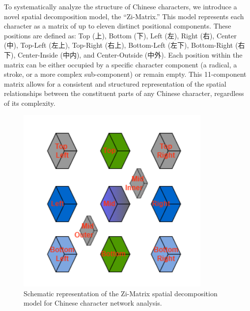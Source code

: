 \documentclass[11pt,letterpaper]{article}
\begin{document}
To systematically analyze the structure of Chinese characters, we
introduce a novel spatial decomposition model, the ``Zi-Matrix.'' This
model represents each character as a matrix of up to eleven distinct
positional components. These positions are defined as: Top (上), Bottom
(下), Left (左), Right (右), Center (中), Top-Left (左上), Top-Right
(右上), Bottom-Left (左下), Bottom-Right (右下), Center-Inside (中内),
and Center-Outside (中外). Each position within the matrix can be either
occupied by a specific character component (a radical, a stroke, or a
more complex sub-component) or remain empty. This 11-component matrix
allows for a consistent and structured representation of the spatial
relationships between the constituent parts of any Chinese character,
regardless of its complexity.

\begin{figure}
\centering
\includegraphics[width=0.85\textwidth]{./images/zi-matrix.png}
\caption{Schematic representation of the Zi-Matrix spatial decomposition
model for Chinese character network analysis.}
\end{figure}
\end{document}
